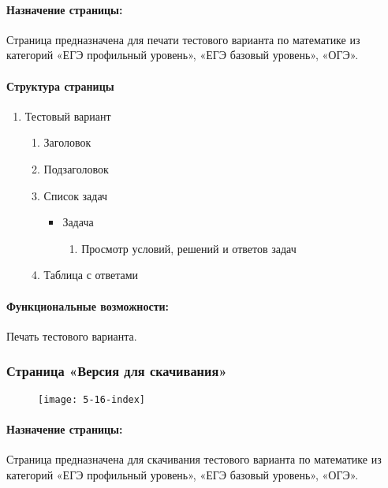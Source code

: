 \paragraph{Назначение страницы:} Страница предназначена для печати тестового варианта по математике из категорий «ЕГЭ профильный уровень», «ЕГЭ базовый уровень», «ОГЭ».

\paragraph{Структура страницы}
\begin{enumerate}
	\item Тестовый вариант
	\begin{enumerate}
		\item Заголовок
		\item Подзаголовок
		\item Список задач
		\begin{itemize}
		\item Задача
		\begin{enumerate}
			\item Просмотр условий, решений и ответов задач
		\end{enumerate}
		\end{itemize}
		\item Таблица с ответами
	\end{enumerate}
\end{enumerate}

\paragraph{Функциональные возможности:} Печать тестового варианта.


\subsubsection{Страница «Версия для скачивания»}
\begin{figure}[H]
	\texttt{[image: 5-16-index]}
\end{figure}
\paragraph{Назначение страницы:} Страница предназначена для скачивания тестового варианта по математике из категорий «ЕГЭ профильный уровень», «ЕГЭ базовый уровень», «ОГЭ».


